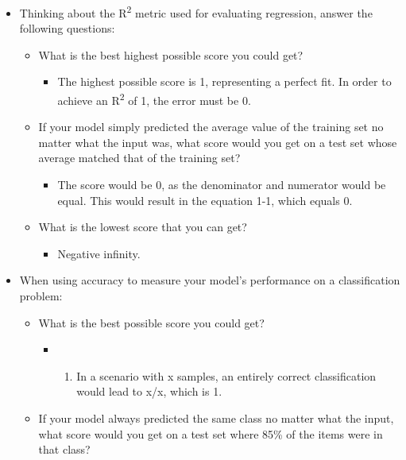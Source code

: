 \documentclass[letterpaper]{article}
\begin{document}
\begin{itemize}
\item Thinking about the R\textsuperscript{2} metric used for evaluating regression, answer
the following questions:

\begin{itemize}
\item What is the best highest possible score you could get?

\begin{itemize}
\item The highest possible score is 1, representing a perfect fit. In
order to achieve an R\textsuperscript{2} of 1, the error must be 0.
\end{itemize}

\item If your model simply predicted the average value of the training set
no matter what the input was, what score would you get on a test set
whose average matched that of the training set?

\begin{itemize}
\item The score would be 0, as the denominator and numerator would be
equal. This would result in the equation 1-1, which equals 0.
\end{itemize}

\item What is the lowest score that you can get?

\begin{itemize}
\item Negative infinity.
\end{itemize}
\end{itemize}

\item When using accuracy to measure your model's performance on a
classification problem:

\begin{itemize}
\item What is the best possible score you could get?

\begin{itemize}
\item \begin{enumerate}
\item In a scenario with x samples, an entirely correct
classification would lead to x/x, which is 1.
\end{enumerate}
\end{itemize}

\item If your model always predicted the same class no matter what the
input, what score would you get on a test set where 85\% of the items
were in that class?


\end{itemize}
\end{itemize}
\end{document}
